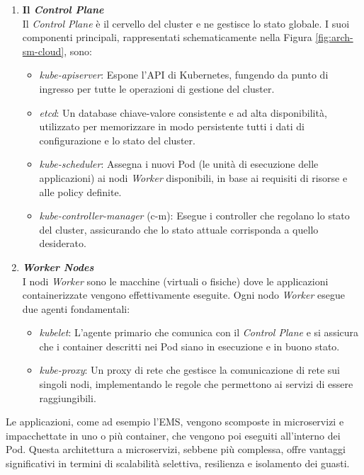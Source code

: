 \begin{enumerate}
    \item \textbf{Il \textit{Control Plane}}\\ Il \textit{Control Plane} è il cervello del cluster e ne gestisce lo stato globale. I suoi componenti principali, rappresentati schematicamente nella Figura \ref{fig:arch-sm-cloud}{}, sono:

    \begin{itemize}
        \item \textit{kube-apiserver}: Espone l'API di Kubernetes, fungendo da punto di ingresso per tutte le operazioni di gestione del cluster.
        \item \textit{etcd}: Un database chiave-valore consistente e ad alta disponibilità, utilizzato per memorizzare in modo persistente tutti i dati di configurazione e lo stato del cluster.
        \item \textit{kube-scheduler}: Assegna i nuovi Pod (le unità di esecuzione delle applicazioni) ai nodi \textit{Worker} disponibili, in base ai requisiti di risorse e alle policy definite.
        \item \textit{kube-controller-manager} (c-m): Esegue i controller che regolano lo stato del cluster, assicurando che lo stato attuale corrisponda a quello desiderato.
    \end{itemize}
    
    \item \textbf{\textit{Worker Nodes}}\\ I nodi \textit{Worker} sono le macchine (virtuali o fisiche) dove le applicazioni containerizzate vengono effettivamente eseguite. Ogni nodo \textit{Worker} esegue due agenti fondamentali:
    
    \begin{itemize}
        \item \textit{kubelet}: L'agente primario che comunica con il \textit{Control Plane} e si assicura che i container descritti nei Pod siano in esecuzione e in buono stato.
        \item \textit{kube-proxy}: Un proxy di rete che gestisce la comunicazione di rete sui singoli nodi, implementando le regole che permettono ai servizi di essere raggiungibili.
    \end{itemize}
\end{enumerate}



Le applicazioni, come ad esempio l'EMS, vengono scomposte in microservizi e impacchettate in uno o più container, che vengono poi eseguiti all'interno dei Pod. Questa architettura a microservizi, sebbene più complessa, offre vantaggi significativi in termini di scalabilità selettiva, resilienza e isolamento dei guasti.


